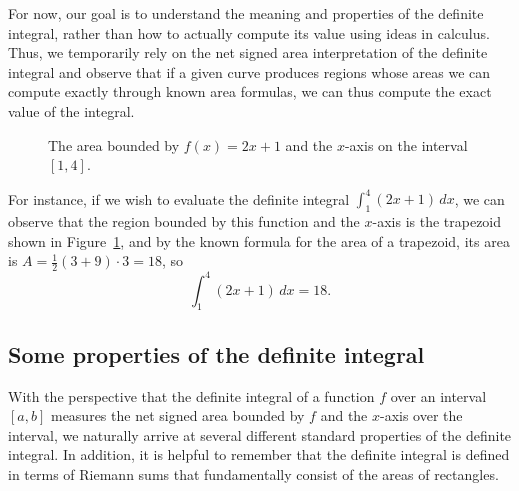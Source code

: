 For now, our goal is to understand the meaning and properties of the definite integral, rather than how to actually compute its value using ideas in calculus.  Thus, we temporarily rely on the net signed area interpretation of the definite integral and observe that if a given curve produces regions whose areas we can compute exactly through known area formulas, we can thus compute the exact value of the integral.  
\begin{figure}[h]
\begin{center}
\caption{The area bounded by $f(x)=2x+1$ and the $x$-axis on the interval $[1,4]$.} \label{F:4.3.TrapArea}
\end{center}
\end{figure}
For instance, if we wish to evaluate the definite integral  $\int_1^4 (2x+1) \, dx$, we can observe that the region bounded by this function and the $x$-axis is the trapezoid shown in Figure~\ref{F:4.3.TrapArea}, and by the known formula for the area of a trapezoid, its area is $A = \frac{1}{2}(3+9) \cdot 3 = 18$, so
$$\int_1^4 (2x+1) \, dx = 18.$$

\newpage



\subsection*{Some properties of the definite integral}

With the perspective that the definite integral of a function $f$ over an interval $[a,b]$ measures the net signed area bounded by $f$ and the $x$-axis over the interval, we naturally arrive at several different standard properties of the definite integral.  In addition, it is helpful to remember that the definite integral is defined in terms of Riemann sums that fundamentally consist of the areas of rectangles.

